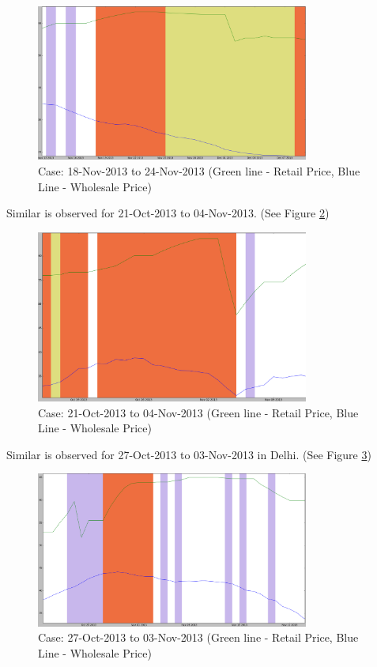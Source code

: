 \documentclass[a4paper,10pt]{article}
\begin{document}
\begin{itemize}
	\begin{figure}[H]
	\centering
	\includegraphics[width=0.8\textwidth]{graphs/Mumbai_RetailvsWS_ill1.png}
	\caption{Case: 18-Nov-2013 to 24-Nov-2013 (Green line - Retail Price, Blue Line - Wholesale Price)}
	\label{fig:Mumbai_RetailvsWS_ill1}
	\end{figure}	
Similar is observed for 21-Oct-2013 to 04-Nov-2013. (See Figure \ref{fig:Mumbai_RetailvsWS_ill2})

	\begin{figure}[H]
	\centering
	\includegraphics[width=0.8\textwidth]{graphs/Mumbai_RetailvsWS_ill2.png}
	\caption{Case: 21-Oct-2013 to 04-Nov-2013 (Green line - Retail Price, Blue Line - Wholesale Price)}
	\label{fig:Mumbai_RetailvsWS_ill2}
	\end{figure}

Similar is observed for 27-Oct-2013 to 03-Nov-2013 in Delhi. (See Figure \ref{fig:Delhi_RetailvsWS_ill1})

	\begin{figure}[H]
	\centering
	\includegraphics[width=0.8\textwidth]{graphs/Delhi_RetailvsWS_ill1.png}
	\caption{Case: 27-Oct-2013 to 03-Nov-2013 (Green line - Retail Price, Blue Line - Wholesale Price)}
	\label{fig:Delhi_RetailvsWS_ill1}
	\end{figure}


\end{itemize}
\end{document}
